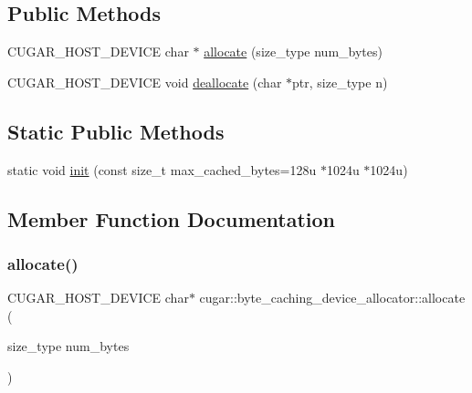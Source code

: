 \subsection*{Public Methods}
\begin{DoxyCompactItemize}
\item 
C\+U\+G\+A\+R\+\_\+\+H\+O\+S\+T\+\_\+\+D\+E\+V\+I\+CE char $\ast$ \hyperlink{structcugar_1_1byte__caching__device__allocator_a7ef892be080f82d6701aeb2542603d2b}{allocate} (size\+\_\+type num\+\_\+bytes)
\item 
C\+U\+G\+A\+R\+\_\+\+H\+O\+S\+T\+\_\+\+D\+E\+V\+I\+CE void \hyperlink{structcugar_1_1byte__caching__device__allocator_af8abeecb89e6f5df9b2b625d1eee27ea}{deallocate} (char $\ast$ptr, size\+\_\+type n)
\end{DoxyCompactItemize}
\subsection*{Static Public Methods}
\begin{DoxyCompactItemize}
\item 
static void \hyperlink{structcugar_1_1byte__caching__device__allocator_a9d2afe2f2942d71f1924aac1d13bcd03}{init} (const size\+\_\+t max\+\_\+cached\+\_\+bytes=128u $\ast$1024u $\ast$1024u)
\end{DoxyCompactItemize}


\subsection{Member Function Documentation}
\mbox{\label{structcugar_1_1byte__caching__device__allocator_a7ef892be080f82d6701aeb2542603d2b}} 
\subsubsection{\texorpdfstring{allocate()}{allocate()}}
{\footnotesize\ttfamily C\+U\+G\+A\+R\+\_\+\+H\+O\+S\+T\+\_\+\+D\+E\+V\+I\+CE char$\ast$ cugar\+::byte\+\_\+caching\+\_\+device\+\_\+allocator\+::allocate (\begin{DoxyParamCaption}\item[{size\+\_\+type}]{num\+\_\+bytes }\end{DoxyParamCaption})\hspace{0.3cm}{\ttfamily [inline]}}

